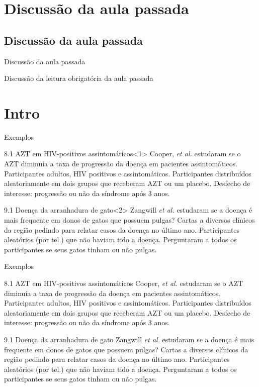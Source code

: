 \documentclass{beamer}
\begin{document}
\section{Discussão da aula passada}

\subsection{Discussão da aula passada}

\begin{frame}{Discussão da aula passada}
  \begin{block}{}
    Discussão da leitura obrigatória da aula passada
  \end{block}
\end{frame}

\section{Intro}

\begin{frame}{Exemplos}
  \begin{exampleblock}{8.1 AZT em HIV-positivos assintomáticos}<1>
    Cooper, {\em et al.} estudaram se o AZT diminuía a taxa de progressão da doença em pacientes assintomáticos.
    Participantes adultos, HIV positivos e assintomáticos.
    Participantes distribuídos aleatoriamente em dois grupos que receberam AZT ou um placebo.
    Desfecho de interesse: progressão ou não da síndrome após 3 anos.
  \end{exampleblock}
  \begin{exampleblock}{9.1 Doença da arranhadura de gato}<2>
    Zangwill {\em et al.} estudaram se a doença é mais frequente em donos de gatos que possuem pulgas?
    Cartas a diversos clínicos da região pedindo para relatar casos da doença no último ano.
    Participantes aleatórios (por tel.) que não haviam tido a doença.
    Perguntaram a todos os participantes se seus gatos tinham ou não pulgas.
  \end{exampleblock}
\end{frame}

\begin{frame}[label=exemplos8.1-9.1]{Exemplos}
  \begin{exampleblock}{8.1 AZT em HIV-positivos assintomáticos}
    Cooper, {\em et al.} estudaram se o AZT diminuía a taxa de progressão da doença em pacientes assintomáticos.
    Participantes adultos, HIV positivos e assintomáticos.
    Participantes distribuídos aleatoriamente em dois grupos que receberam AZT ou um placebo.
    Desfecho de interesse: progressão ou não da síndrome após 3 anos.
  \end{exampleblock}
  \begin{exampleblock}{9.1 Doença da arranhadura de gato}
    Zangwill {\em et al.} estudaram se a doença é mais frequente em donos de gatos que possuem pulgas?
    Cartas a diversos clínicos da região pedindo para relatar casos da doença no último ano.
    Participantes aleatórios (por tel.) que não haviam tido a doença.
    Perguntaram a todos os participantes se seus gatos tinham ou não pulgas.
  \end{exampleblock}
\end{frame}
\end{document}
